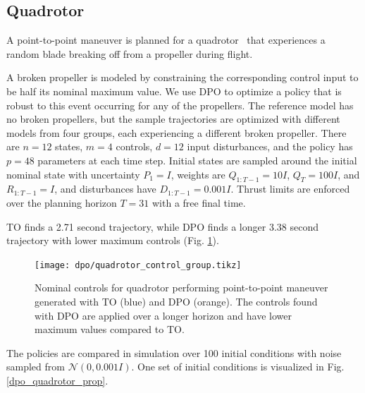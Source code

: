 \subsection{Quadrotor}
A point-to-point maneuver is planned for a quadrotor~\cite{mellinger2012trajectory} that experiences a random blade breaking off from a propeller during flight. 

A broken propeller is modeled by constraining the corresponding control input to be half its nominal maximum value. We use DPO to optimize a policy that is robust to this event occurring for any of the propellers. The reference model has no broken propellers, but the sample trajectories are optimized with different models from four groups, each experiencing a different broken propeller. There are $n = 12$ states, $m = 4$ controls, $d = 12$ input disturbances, and the policy has $p = 48$ parameters at each time step. Initial states are sampled around the initial nominal state with uncertainty $P_1 = I$, weights are $Q_{1:T-1} = 10I$, $Q_T = 100I$, and $R_{1:T-1} = I$, and disturbances have $D_{1:T-1} = 0.001 I$. Thrust limits are enforced over the planning horizon $T=31$ with a free final time.	

TO finds a 2.71 second trajectory, while DPO finds a longer 3.38 second trajectory with lower maximum controls (Fig. \ref{dpo_quadrotor_control}). 

\begin{figure}[H]
	\centering
	\texttt{[image: dpo/quadrotor\_control\_group.tikz]}
	\caption[Action trajectory comparison between trajectory optimization and Direct Policy Optimization for quadrotor]{Nominal controls for quadrotor performing point-to-point maneuver generated with TO (blue) and DPO (orange). The controls found with DPO are applied over a longer horizon and have lower maximum values compared to TO.}
	\label{dpo_quadrotor_control}
\end{figure}

The policies are compared in simulation over 100 initial conditions with noise sampled from $\mathcal{N}(0, 0.001 I)$. One set of initial conditions is visualized in Fig. \ref{dpo_quadrotor_prop}. 

